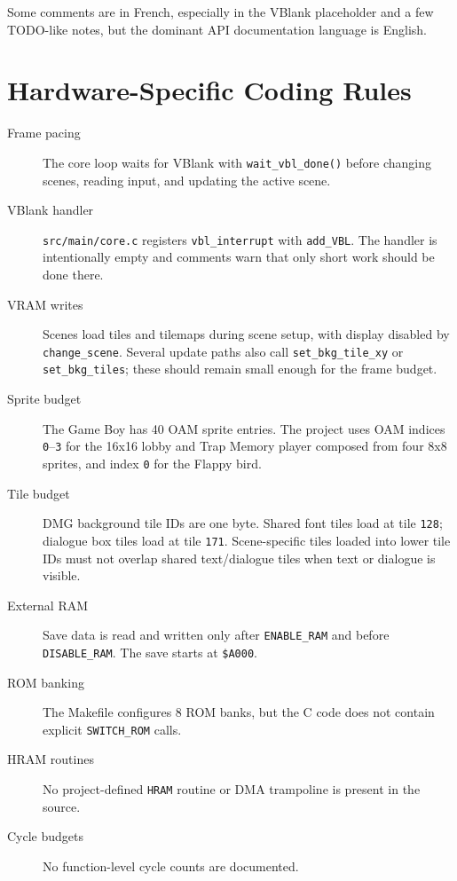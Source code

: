Some comments are in French, especially in the VBlank placeholder and a few TODO-like notes, but the dominant API documentation language is English.

\section{Hardware-Specific Coding Rules}

\begin{description}
  \item[Frame pacing] The core loop waits for VBlank with \texttt{wait\_vbl\_done()} before changing scenes, reading input, and updating the active scene.
  \item[VBlank handler] \texttt{src/main/core.c} registers \texttt{vbl\_interrupt} with \texttt{add\_VBL}. The handler is intentionally empty and comments warn that only short work should be done there.
  \item[VRAM writes] Scenes load tiles and tilemaps during scene setup, with display disabled by \texttt{change\_scene}. Several update paths also call \texttt{set\_bkg\_tile\_xy} or \texttt{set\_bkg\_tiles}; these should remain small enough for the frame budget.
  \item[Sprite budget] The Game Boy has 40 OAM sprite entries. The project uses OAM indices \texttt{0}--\texttt{3} for the 16x16 lobby and Trap Memory player composed from four 8x8 sprites, and index \texttt{0} for the Flappy bird.
  \item[Tile budget] DMG background tile IDs are one byte. Shared font tiles load at tile \texttt{128}; dialogue box tiles load at tile \texttt{171}. Scene-specific tiles loaded into lower tile IDs must not overlap shared text/dialogue tiles when text or dialogue is visible.
  \item[External RAM] Save data is read and written only after \texttt{ENABLE\_RAM} and before \texttt{DISABLE\_RAM}. The save starts at \texttt{\$A000}.
  \item[ROM banking] The Makefile configures 8 ROM banks, but the C code does not contain explicit \texttt{SWITCH\_ROM} calls.
  \item[HRAM routines] No project-defined \texttt{HRAM} routine or DMA trampoline is present in the source.
  \item[Cycle budgets] No function-level cycle counts are documented.
\end{description}
